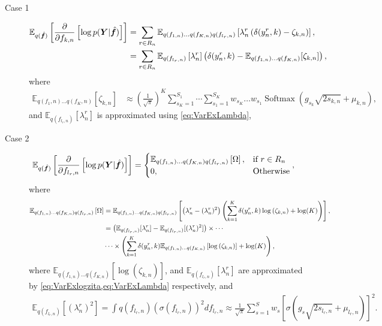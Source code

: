 \documentclass[9pt]{article}
\providecommand{\ve}[1]{{\bm{#1}}}%
\providecommand{\mat}[1]{{\bm{#1}}} %
\providecommand{\ve}[1]{{\mathbf{#1}}}
\providecommand{\mat}[1]{{\mathbf{#1}}}
\newcommand{\fracpartial}[2]{\frac{\partial #1}{\partial  #2}} %
\begin{document}
\begin{enumerate}
	\begin{description}
		\item[Case 1] 
		\begin{align}
		\notag \mathbb{E}_{q(\hat{\ve{f}})}\left[\fracpartial{}{f_{k,n}}\left[\log p(\mat{Y}|\hat{\ve{f}})\right]\right] &= \sum_{r\in R_n}\mathbb{E}_{q(f_{1,n})\dots q(f_{K,n})q(f_{l_r,n})}\left[{\lambda}_n^r\left(\delta(y_n^r,k)-\zeta_{k,n}\right)\right],\\
		&= \sum_{r\in R_n}\mathbb{E}_{q(f_{l_r,n})}\left[{\lambda}_n^r\right] \left(\delta(y_n^r,k) - \mathbb{E}_{q(f_{1,n})\dots q(f_{K,n})}[\zeta_{k,n}]\right),
		\end{align}
		where
		\begin{align}
		\label{eq:VarExzita}
		    \mathbb{E}_{q(f_1,n)\dots q(f_K,n)}\left[\zeta_{k,n}\right]&\approx \left(\frac{1}{\sqrt{\pi}}\right)^{K}\sum_{s_K=1}^{S_1}\cdots \sum_{s_1=1}^{S_K} w_{s_K}\dots w_{s_1} \operatorname{Softmax}\left(g_{s_k}\sqrt{2s_{k,n}} + \mu_{k,n}\right),
		\end{align}
		and $\mathbb{E}_{q(f_{l_r,n})}\left[{\lambda}_n^r\right]$ is approximated using \cref{eq:VarExLambda},
		
		\item[Case 2] 
		\begin{align}
		\notag \mathbb{E}_{q(\hat{\ve{f}})}\left[\fracpartial{}{f_{l_r,n}}\left[\log p(\mat{Y}|\hat{\ve{f}})\right]\right] &= \begin{cases}
		\mathbb{E}_{q(f_{1,n})\dots q(f_{K,n})q(f_{l_r,n})}\left[\Omega\right], & \mbox{if $r\in R_n$}\\
		0, & \mbox{Otherwise}
		\end{cases},
		\end{align}
		where 
		\begin{align}
		\notag\mathbb{E}_{q(f_{1,n})\dots q(f_{K,n})q(f_{l_r,n})}\left[\Omega\right] &= \mathbb{E}_{q(f_{1,n})\dots q(f_{K,n})q(f_{l_r,n})}\left[\left({\lambda}_n^r - ({\lambda}_n^r)^2\right)\left(\sum_{k=1}^{K}\delta(y_n^r,k)\log\left(\zeta_{k,n}\right) + \log(K)  \right)\right],\\
		\notag&\hspace{0.0cm}= \left(\mathbb{E}_{q(f_{l_r,n})}[{\lambda}_n^r]-\mathbb{E}_{q(f_{l_r,n})}[({\lambda}_n^r)^2]\right)\times\cdots\\
		&\cdots\times\left(\sum_{k=1}^{K}\delta(y_n^r,k)\mathbb{E}_{q(f_{1,n})\dots q(f_{K,n})}\left[\log\left(\zeta_{k,n}\right)\right] + \log(K) \right),
		\end{align}
		where $\mathbb{E}_{q(f_{1,n})\dots q(f_{K,n})}\left[\log\left(\zeta_{k,n}\right)\right]$, and $\mathbb{E}_{q(f_{l_r,n})}[{\lambda}_n^r]$ are approximated by \cref{eq:VarExlogzita,eq:VarExLambda} respectively, and 
		\begin{align}
		    \mathbb{E}_{q(f_{l_r,n})}[({\lambda}_n^r)^2] = \int q(f_{l_r,n})\left(\sigma(f_{l_r,n})\right)^2df_{l_r,n} \approx \frac{1}{\sqrt{\pi}}\sum_{s=1}^{S}w_s \left[\sigma\left(g_s\sqrt{2s_{l_r,n}} + \mu_{l_r,n}\right)\right]^2.
		\label{eq:VarExLam2}
		\end{align}
	\end{description}
	

\end{enumerate}
\end{document}

